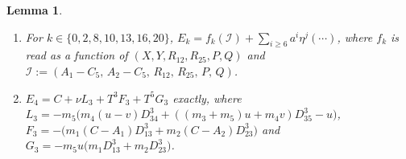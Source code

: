 \documentclass[11pt]{amsart}
\newenvironment{romanlist}{\begin{enumerate}\renewcommand{\labelenumi}{(\roman{enumi})}%
  \renewcommand{\theenumi}{\roman{enumi}}}{\end{enumerate}}
\newtheorem{lemma}[theorem]{Lemma}
\theoremstyle{definition}
\theoremstyle{remark}
\begin{document}
{\begin{lemma}
\begin{romanlist}
\begin{align*}
  \tau_1&=m_3(B_3-D)D_{13}^3+m_4(B_4-D)D_{14}^3,\\
  \tau_3&=m_3(B_3-D)D_{23}^3+m_4(B_4-D)D_{24}^3;
\end{align*}
the monomials of $E_1-E_3$ are $\eta^2$, $T^3$, $a^6\eta^2$ and $a^9\eta^5$.
\item For $k\in\{0,2,8,10,13,16,20\}$, $E_k=f_k(\mathcal I)+\sum_{i\ge6}a^i\eta^j(\cdots)$, where
$f_k$ is read as a function of $(X,Y,R_{12},R_{25},P,Q)$ and
$\mathcal I:=(A_1-C_5,\,A_2-C_5,\,R_{12},\,R_{25},\,P,\,Q)$.
\item $E_4=C+\nu L_3+T^3F_3+T^5G_3$ exactly, where
$L_3=-m_5\bigl(m_4(u-v)D_{34}^3+((m_3+m_5)u+m_4v)D_{35}^3-u\bigr)$,
$F_3=-\bigl(m_1(C-A_1)D_{13}^3+m_2(C-A_2)D_{23}^3\bigr)$ and
$G_3=-m_5u\bigl(m_1D_{13}^3+m_2D_{23}^3\bigr)$.
\end{romanlist}
\end{lemma}}
\end{document}
